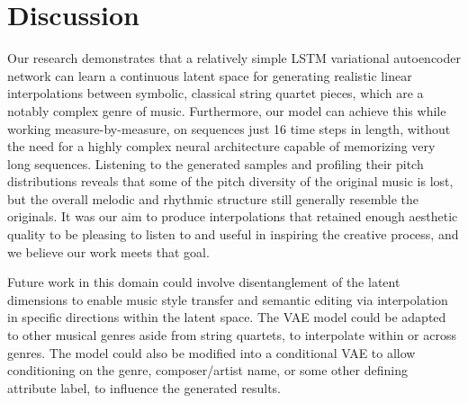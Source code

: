 \documentclass[sigconf,authorversion]{acmart}
\begin{document}
\section{Discussion}

Our research demonstrates that a relatively simple LSTM variational
autoencoder network can learn a continuous latent space for generating
realistic linear interpolations between symbolic, classical string
quartet pieces, which are a notably complex genre of music.
Furthermore, our model can achieve this while working
measure-by-measure, on sequences just 16 time steps in length, without
the need for a highly complex neural architecture capable of
memorizing very long sequences. Listening to the generated samples and
profiling their pitch distributions reveals that some of the pitch
diversity of the original music is lost, but the overall melodic and
rhythmic structure still generally resemble the originals. It was our
aim to produce interpolations that retained enough aesthetic quality
to be pleasing to listen to and useful in inspiring the creative
process, and we believe our work meets that goal.

Future work in this domain could involve disentanglement of the latent
dimensions to enable music style transfer and semantic editing via
interpolation in specific directions within the latent space. The VAE
model could be adapted to other musical genres aside from string
quartets, to interpolate within or across genres. The model could also
be modified into a conditional VAE to allow conditioning on the genre,
composer/artist name, or some other defining attribute label, to
influence the generated results.



\end{document}
